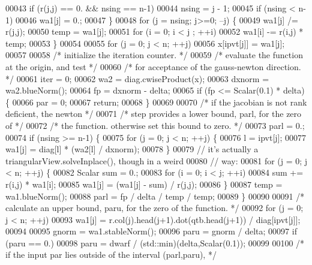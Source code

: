\begin{DoxyCode}
00043         \textcolor{keywordflow}{if} (r(j,j) == 0. && nsing == n-1)
00044             nsing = j - 1;
00045         \textcolor{keywordflow}{if} (nsing < n-1)
00046             wa1[j] = 0.;
00047     \}
00048     \textcolor{keywordflow}{for} (j = nsing; j>=0; --j) \{
00049         wa1[j] /= r(j,j);
00050         temp = wa1[j];
00051         \textcolor{keywordflow}{for} (i = 0; i < j ; ++i)
00052             wa1[i] -= r(i,j) * temp;
00053     \}
00054 
00055     \textcolor{keywordflow}{for} (j = 0; j < n; ++j)
00056         x[ipvt[j]] = wa1[j];
00057 
00058     \textcolor{comment}{/* initialize the iteration counter. */}
00059     \textcolor{comment}{/* evaluate the function at the origin, and test */}
00060     \textcolor{comment}{/* for acceptance of the gauss-newton direction. */}
00061     iter = 0;
00062     wa2 = diag.cwiseProduct(x);
00063     dxnorm = wa2.blueNorm();
00064     fp = dxnorm - delta;
00065     \textcolor{keywordflow}{if} (fp <= Scalar(0.1) * delta) \{
00066         par = 0;
00067         \textcolor{keywordflow}{return};
00068     \}
00069 
00070     \textcolor{comment}{/* if the jacobian is not rank deficient, the newton */}
00071     \textcolor{comment}{/* step provides a lower bound, parl, for the zero of */}
00072     \textcolor{comment}{/* the function. otherwise set this bound to zero. */}
00073     parl = 0.;
00074     \textcolor{keywordflow}{if} (nsing >= n-1) \{
00075         \textcolor{keywordflow}{for} (j = 0; j < n; ++j) \{
00076             l = ipvt[j];
00077             wa1[j] = diag[l] * (wa2[l] / dxnorm);
00078         \}
00079         \textcolor{comment}{// it's actually a triangularView.solveInplace(), though in a weird}
00080         \textcolor{comment}{// way:}
00081         \textcolor{keywordflow}{for} (j = 0; j < n; ++j) \{
00082             Scalar sum = 0.;
00083             \textcolor{keywordflow}{for} (i = 0; i < j; ++i)
00084                 sum += r(i,j) * wa1[i];
00085             wa1[j] = (wa1[j] - sum) / r(j,j);
00086         \}
00087         temp = wa1.blueNorm();
00088         parl = fp / delta / temp / temp;
00089     \}
00090 
00091     \textcolor{comment}{/* calculate an upper bound, paru, for the zero of the function. */}
00092     \textcolor{keywordflow}{for} (j = 0; j < n; ++j)
00093         wa1[j] = r.col(j).head(j+1).dot(qtb.head(j+1)) / diag[ipvt[j]];
00094 
00095     gnorm = wa1.stableNorm();
00096     paru = gnorm / delta;
00097     \textcolor{keywordflow}{if} (paru == 0.)
00098         paru = dwarf / (std::min)(delta,Scalar(0.1));
00099 
00100     \textcolor{comment}{/* if the input par lies outside of the interval (parl,paru), */}

\end{DoxyCode}
